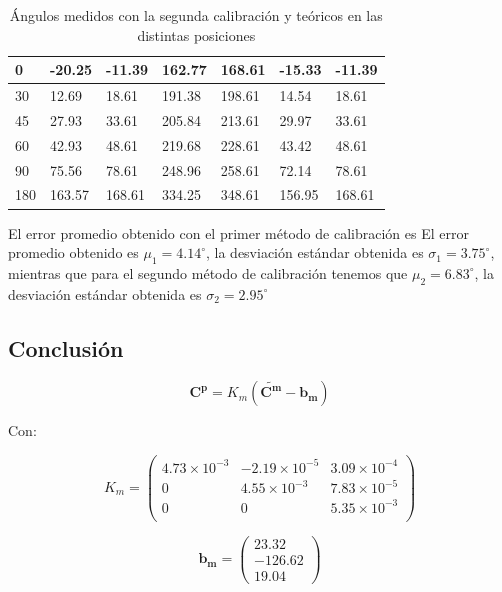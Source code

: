 \documentclass[spanish,12pt,a4paper,titlepage]{report}
\begin{document}
\begin{table}
\begin{tabular}{|p{50pt}|p{50pt}|p{50pt}|p{50pt}|p{51pt}|p{50pt}|p{50pt}|}
 0    &    -20.25  & -11.39& 162.77& 168.61&-15.33 & -11.39\\ \hline
 30   &   12.69    & 18.61& 191.38& 198.61&14.54 & 18.61 \\ \hline
 45   &   27.93 	  &	33.61 & 205.84 & 213.61 & 29.97 & 33.61 \\ \hline
 60   &   42.93 	  & 48.61 & 219.68 & 228.61 & 43.42 & 48.61 \\ \hline
 90   &   75.56 	  & 78.61 & 248.96 & 258.61 & 72.14 & 78.61 \\ \hline
 180  &   163.57	  &	168.61& 334.25 & 348.61 & 156.95 & 168.61 \\ \hline
 
\end{tabular}
\caption{Ángulos medidos con la segunda calibración y teóricos en las distintas posiciones}
\label{tab:angulos}
\end{table} 


El error promedio obtenido con el primer método de calibración es 
El error promedio obtenido es $\mu_1=4.14^\circ$, la desviación estándar obtenida es $\sigma_1
=3.75^\circ$, mientras que para el segundo método de calibración tenemos que $\mu_2=6.83^\circ$, la desviación estándar obtenida es $\sigma_2
=2.95^\circ$



\subsection{Conclusión}
$$
\mathbf{C^p} =K_m (\mathbf{\tilde{C^m}} -  \mathbf{b_m})
$$

Con:


$$K_m=\left( \begin{array}{ccc}
 4.73\times10^{-3}   &  -2.19\times10^{-5}    &  3.09\times10^{-4} \\
                         0      & 4.55\times10^{-3}   &   7.83\times10^{-5} \\
                         0     &                    0   &    5.35\times10^{-3} \\
\end{array}
\right)
$$

$$
\mathbf{b_m}=\left(\begin{array}{c}
	23.32\\
	-126.62\\
    19.04
\end{array}\right)
$$
\end{document}
